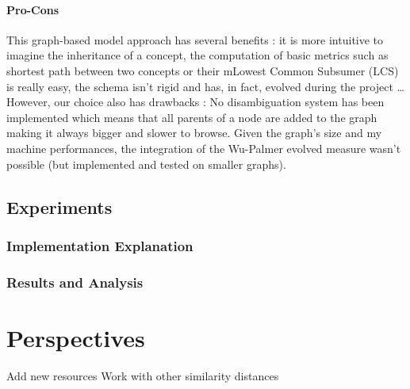 \paragraph{Pro-Cons} %
\label{par:pro_cons}
This graph-based model approach has several benefits : it is more intuitive to imagine the inheritance of a concept, the computation of basic metrics such as shortest path between two concepts or their mLowest Common Subsumer (LCS) is really easy, the schema isn't rigid and has, in fact, evolved during the project \dots\\
However, our choice also has drawbacks : No disambiguation system has been implemented which means that all parents of a node are added to the graph making it always bigger and slower to browse. Given the graph's size and my machine performances, the integration of the Wu-Palmer evolved measure wasn't possible (but implemented and tested on smaller graphs).

\subsection{Experiments} %
\label{sub:experiments}
\subsubsection{Implementation Explanation} %
\label{ssub:implementation_explanation}

\subsubsection{Results and Analysis} %
\label{ssub:results_and_analysis}



\section{Perspectives} %
\label{sec:perspectives}
Add new resources
Work with other similarity distances

